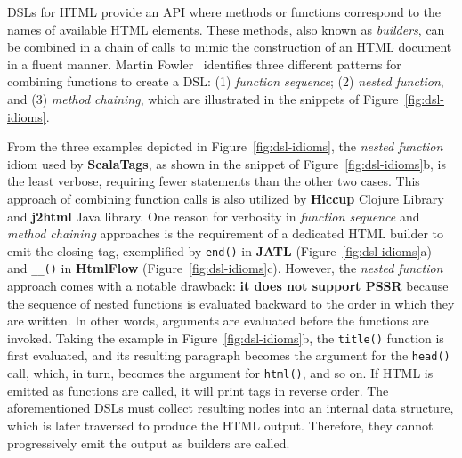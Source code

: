 \documentclass[software,article,accept,pdftex,moreauthors]{Definitions/mdpi}
\begin{document}
DSLs for HTML provide an API where methods or functions correspond to the names
of available HTML elements. These methods, also known as \textit{builders}, can
be combined in a chain of calls to mimic the construction of an HTML document
in a fluent manner. Martin Fowler~\cite{Fowler03} identifies three different
patterns for combining functions to create a DSL: (1) \textit{function
  sequence}; (2) \textit{nested function}, and (3) \textit{method chaining}, which
are illustrated in the snippets of Figure~\ref{fig:dsl-idioms}.

From the three examples depicted in Figure~\ref{fig:dsl-idioms}, the
\textit{nested function} idiom used by \textbf{ScalaTags}, as shown in the
snippet of Figure~\ref{fig:dsl-idioms}b, is the least verbose, requiring
fewer statements than the other two cases. This approach of combining function
calls is also utilized by \textbf{Hiccup} Clojure Library and \textbf{j2html}
Java library. One reason for verbosity in \textit{function sequence} and
\textit{method chaining} approaches is the requirement of a dedicated HTML
builder to emit the closing tag, exemplified by \texttt{end()} in \textbf{JATL}
(Figure~\ref{fig:dsl-idioms}a) and \texttt{\_\_()} in \textbf{HtmlFlow}
(Figure~\ref{fig:dsl-idioms}c). However, the \textit{nested function} approach
comes with a notable drawback: \textbf{it does not support PSSR} because the
sequence of nested functions is evaluated backward to the order in which they
are written. In other words, arguments are evaluated before the functions are
invoked. Taking the example in Figure~\ref{fig:dsl-idioms}b, the
\texttt{title()} function is first evaluated, and its resulting paragraph
becomes the argument for the \texttt{head()} call, which, in turn, becomes the
argument for \texttt{html()}, and so on. If HTML is emitted as functions are
called, it will print tags in reverse order. The aforementioned DSLs must
collect resulting nodes into an internal data structure, which is later
traversed to produce the HTML output. Therefore, they cannot progressively emit
the output as builders are called.
\end{document}
